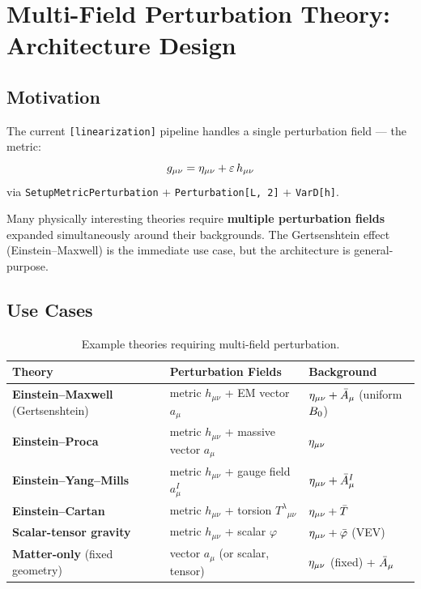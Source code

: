 
\section{Multi-Field Perturbation Theory: Architecture Design}
\label{sec:multi-field-perturbation}

\subsection{Motivation}
\label{sec:mfp-motivation}

The current \texttt{[linearization]} pipeline handles a single perturbation field --- the metric:
\begin{equation}
  g_{\mu\nu} = \eta_{\mu\nu} + \varepsilon\, h_{\mu\nu}
  \label{eq:mfp-metric-pert}
\end{equation}
via \texttt{SetupMetricPerturbation} + \texttt{Perturbation[L, 2]} + \texttt{VarD[h]}.

Many physically interesting theories require \textbf{multiple perturbation fields} expanded simultaneously around their backgrounds. The Gertsenshtein effect (Einstein--Maxwell) is the immediate use case, but the architecture is general-purpose.

\subsection{Use Cases}
\label{sec:mfp-use-cases}

\begin{table}[htbp]
\centering
\caption{Example theories requiring multi-field perturbation.}
\label{tab:mfp-use-cases}
\begin{tabular}{@{}lll@{}}
\toprule
Theory & Perturbation Fields & Background \\
\midrule
\textbf{Einstein--Maxwell} (Gertsenshtein) & metric $h_{\mu\nu}$ + EM vector $a_\mu$ & $\eta_{\mu\nu} + \bar{A}_\mu$ (uniform $B_0$) \\
\textbf{Einstein--Proca} & metric $h_{\mu\nu}$ + massive vector $a_\mu$ & $\eta_{\mu\nu}$ \\
\textbf{Einstein--Yang--Mills} & metric $h_{\mu\nu}$ + gauge field $a_\mu^I$ & $\eta_{\mu\nu} + \bar{A}_\mu^I$ \\
\textbf{Einstein--Cartan} & metric $h_{\mu\nu}$ + torsion $T^\lambda{}_{\mu\nu}$ & $\eta_{\mu\nu} + \bar{T}$ \\
\textbf{Scalar-tensor gravity} & metric $h_{\mu\nu}$ + scalar $\varphi$ & $\eta_{\mu\nu} + \bar{\varphi}$ (VEV) \\
\textbf{Matter-only} (fixed geometry) & vector $a_\mu$ (or scalar, tensor) & $\eta_{\mu\nu}$ (fixed) + $\bar{A}_\mu$ \\
\bottomrule
\end{tabular}
\end{table}


